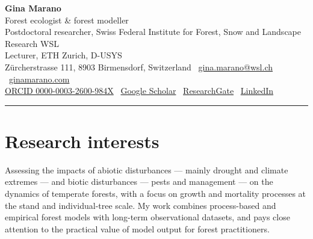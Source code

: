 \documentclass[10pt,a4paper]{article}
\begin{document}
{\serifhead\bfseries\fontsize{24}{27}\selectfont Gina Marano}\\[3pt]
{\normalsize\color{inksoft}Forest ecologist \& forest modeller}\\[2pt]
{\small\color{muted}Postdoctoral researcher, Swiss Federal Institute for Forest, Snow and Landscape Research WSL\\
Lecturer, ETH Zurich, D-USYS}\\[5pt]
{\footnotesize\color{muted}Z\"urcherstrasse 111, 8903 Birmensdorf, Switzerland \textperiodcentered\ \href{mailto:gina.marano@wsl.ch}{gina.marano@wsl.ch} \textperiodcentered\ \href{https://ginamarano.com}{ginamarano.com}\\
\href{https://orcid.org/0000-0003-2600-984X}{ORCID 0000-0003-2600-984X} \textperiodcentered\ \href{https://scholar.google.com/citations?user=OOLvF6kAAAAJ}{Google Scholar} \textperiodcentered\ \href{https://www.researchgate.net/profile/Gina-Marano}{ResearchGate} \textperiodcentered\ \href{https://www.linkedin.com/in/gina-marano-60a66270/}{LinkedIn}}

\vspace{6pt}
{\color{rule}\rule{\linewidth}{0.8pt}}
\vspace{4pt}

\section*{Research interests}
{\small\color{inksoft}Assessing the impacts of abiotic disturbances --- mainly drought and climate extremes --- and biotic disturbances --- pests and management --- on the dynamics of temperate forests, with a focus on growth and mortality processes at the stand and individual-tree scale. My work combines process-based and empirical forest models with long-term observational datasets, and pays close attention to the practical value of model output for forest practitioners.}
\end{document}
